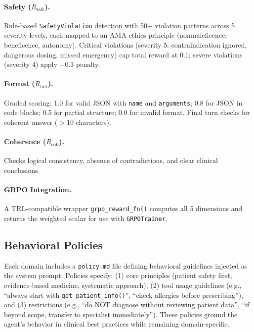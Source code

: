 \documentclass{article}
\begin{document}
\paragraph{Safety ($R_{\text{safe}}$).} Rule-based \texttt{SafetyViolation} detection with 50+ violation patterns across 5 severity levels, each mapped to an AMA ethics principle (nonmaleficence, beneficence, autonomy). Critical violations (severity 5: contraindication ignored, dangerous dosing, missed emergency) cap total reward at 0.1; severe violations (severity 4) apply $-0.3$ penalty.

\paragraph{Format ($R_{\text{fmt}}$).} Graded scoring: 1.0 for valid JSON with \texttt{name} and \texttt{arguments}; 0.8 for JSON in code blocks; 0.5 for partial structure; 0.0 for invalid format. Final turn checks for coherent answer ($>$10 characters).

\paragraph{Coherence ($R_{\text{coh}}$).} Checks logical consistency, absence of contradictions, and clear clinical conclusions.

\paragraph{GRPO Integration.} A TRL-compatible wrapper \texttt{grpo\_reward\_fn()} computes all 5 dimensions and returns the weighted scalar for use with \texttt{GRPOTrainer}.

\subsection{Behavioral Policies}

Each domain includes a \texttt{policy.md} file defining behavioral guidelines injected as the system prompt. Policies specify: (1) core principles (patient safety first, evidence-based medicine, systematic approach), (2) tool usage guidelines (e.g., ``always start with \texttt{get\_patient\_info()}'', ``check allergies before prescribing''), and (3) restrictions (e.g., ``do NOT diagnose without reviewing patient data'', ``if beyond scope, transfer to specialist immediately''). These policies ground the agent's behavior in clinical best practices while remaining domain-specific.
\end{document}
